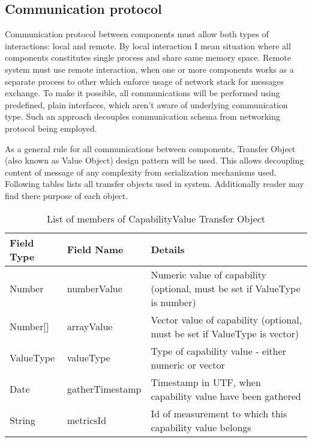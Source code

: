 \subsection{Communication protocol}
\label{subsec:arch_comm_protocol}
Communication protocol between components must allow both types of interactions: local and remote. By local interaction
I mean situation where all components constitutes single process and share same memory space. Remote system must use
remote interaction, when one or more components works as a separate process to other which enforce usage of network
stack for messages exchange. To make it possible, all communications will be performed using predefined, plain
interfaces, which aren't aware of underlying communication type. Such an approach decouples communication schema
from networking protocol being employed.

As a general rule for all communications between components, Transfer Object (also known as Value Object) design
pattern will be used\cite{0131422464}. This allows decoupling content of message of any complexity from serialization
mechanisms used. Following tables lists all transfer objects used in system. Additionally reader may find there purpose
of each object. 

\renewcommand*\arraystretch{1.2}


\begin{table}[ht] %
\begin{tabular}{| m{} | m{} | m{} |}
   \hline 
   \cellcolor[gray]{0.9} Field Type & \cellcolor[gray]{0.9} Field Name & \cellcolor[gray]{0.9} Details \\
   \hline 
   Number & numberValue & Numeric value of capability (optional, must be set if ValueType is number) \\
   Number[] & arrayValue & Vector value of capability (optional, must be set if ValueType is vector)  \\
   ValueType & valueType & Type of capability value - either numeric or vector\\
   Date & gatherTimestamp & Timestamp in UTF, when capability value have been gathered \\
   String & metricsId & Id of measurement to which this capability value belongs \\
   \hline 
\end{tabular}
 \caption{List of members of CapabilityValue Transfer Object}
 \label{tab:TO_CapValue}
\end{table} %

